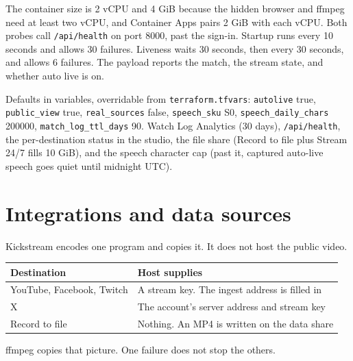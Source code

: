 \documentclass[11pt]{article}
\begin{document}
The container size is 2 vCPU and 4 GiB because the hidden browser and ffmpeg need
at least two vCPU, and Container Apps pairs 2 GiB with each vCPU.
Both probes call \texttt{/api/health} on port 8000, past the sign-in.
Startup runs every 10 seconds and allows 30 failures.
Liveness waits 30 seconds, then every 30 seconds, and allows 6 failures.
The payload reports the match, the stream state, and whether auto live is on.

Defaults in variables, overridable from \texttt{terraform.tfvars}:
\texttt{autolive} true, \texttt{public\_view} true, \texttt{real\_sources} false,
\texttt{speech\_sku} S0, \texttt{speech\_daily\_chars} 200000,
\texttt{match\_log\_ttl\_days} 90.
Watch Log Analytics (30 days), \texttt{/api/health}, the per-destination status
in the studio, the file share (Record to file plus Stream 24/7 fills 10 GiB),
and the speech character cap (past it, captured auto-live speech goes quiet
until midnight UTC).

\section{Integrations and data sources}

Kickstream encodes one program and copies it.
It does not host the public video.

\begin{tabularx}{\textwidth}{@{}lX@{}}
\toprule
Destination & Host supplies \\
\midrule
YouTube, Facebook, Twitch & A stream key. The ingest address is filled in \\
X & The account's server address and stream key \\
Record to file & Nothing. An MP4 is written on the data share \\
\bottomrule
\end{tabularx}

\begin{center}
\end{center}
{\small\color{Muted} ffmpeg copies that picture. One failure does not stop the others.\par}
\end{document}
